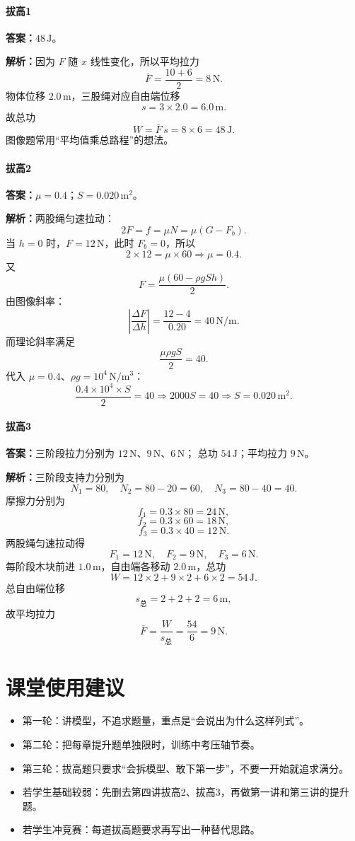 \documentclass[12pt,a4paper]{ctexart}
\newcommand{\Ans}[1]{\par\noindent\textbf{答案：}#1\par}
\newcommand{\Sol}[1]{\par\noindent\textbf{解析：}#1\par}
\begin{document}
\paragraph{拔高1}
\Ans{$48\,\mathrm{J}$。}
\Sol{因为 $F$ 随 $x$ 线性变化，所以平均拉力
\[
\bar F=\frac{10+6}{2}=8\,\mathrm{N}.
\]
物体位移 $2.0\,\mathrm{m}$，三股绳对应自由端位移
\[
s=3\times 2.0=6.0\,\mathrm{m}.
\]
故总功
\[
W=\bar F\, s = 8\times 6=48\,\mathrm{J}.
\]
图像题常用“平均值乘总路程”的想法。}

\paragraph{拔高2}
\Ans{$\mu=0.4$；$S=0.020\,\mathrm{m^2}$。}
\Sol{两股绳匀速拉动：
\[
2F=f=\mu N=\mu (G-F_b).
\]
当 $h=0$ 时，$F=12\,\mathrm{N}$，此时 $F_b=0$，所以
\[
2\times 12=\mu \times 60 \Rightarrow \mu=0.4.
\]
又
\[
F=\frac{\mu(60-\rho gSh)}{2}.
\]
由图像斜率：
\[
\left|\frac{\Delta F}{\Delta h}\right|
=\frac{12-4}{0.20}=40\,\mathrm{N/m}.
\]
而理论斜率满足
\[
\frac{\mu \rho g S}{2}=40.
\]
代入 $\mu=0.4$、$\rho g=10^4\,\mathrm{N/m^3}$：
\[
\frac{0.4\times 10^4 \times S}{2}=40
\Rightarrow 2000S=40
\Rightarrow S=0.020\,\mathrm{m^2}.
\]}

\paragraph{拔高3}
\Ans{三阶段拉力分别为 $12\,\mathrm{N}$、$9\,\mathrm{N}$、$6\,\mathrm{N}$；
总功 $54\,\mathrm{J}$；平均拉力 $9\,\mathrm{N}$。}
\Sol{三阶段支持力分别为
\[
N_1=80,\quad N_2=80-20=60,\quad N_3=80-40=40.
\]
摩擦力分别为
\[
f_1=0.3\times 80=24\,\mathrm{N},
\]
\[
f_2=0.3\times 60=18\,\mathrm{N},
\]
\[
f_3=0.3\times 40=12\,\mathrm{N}.
\]
两股绳匀速拉动得
\[
F_1=12\,\mathrm{N},\quad F_2=9\,\mathrm{N},\quad F_3=6\,\mathrm{N}.
\]
每阶段木块前进 $1.0\,\mathrm{m}$，自由端各移动 $2.0\,\mathrm{m}$，总功
\[
W=12\times 2+9\times 2+6\times 2=54\,\mathrm{J}.
\]
总自由端位移
\[
s_{\text{总}}=2+2+2=6\,\mathrm{m},
\]
故平均拉力
\[
\bar F=\frac{W}{s_{\text{总}}}=\frac{54}{6}=9\,\mathrm{N}.
\]}

\section*{课堂使用建议}
\begin{itemize}[leftmargin=2.2em]
\item 第一轮：讲模型，不追求题量，重点是“会说出为什么这样列式”。
\item 第二轮：把每章提升题单独限时，训练中考压轴节奏。
\item 第三轮：拔高题只要求“会拆模型、敢下第一步”，不要一开始就追求满分。
\item 若学生基础较弱：先删去第四讲拔高2、拔高3，再做第一讲和第三讲的提升题。
\item 若学生冲竞赛：每道拔高题要求再写出一种替代思路。
\end{itemize}
\end{document}
